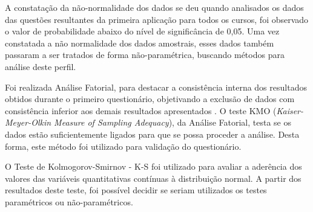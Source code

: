 A constatação da não-normalidade dos dados se deu quando
analisados os dados das questões resultantes da primeira aplicação para todos os cursos, foi observado o valor de probabilidade abaixo do nível de significância de 0,05. Uma vez constatada a não normalidade dos dados amostrais, esses dados também passaram a ser tratados de forma não-paramétrica, buscando métodos para análise deste perfil. 

Foi realizada Análise Fatorial, para destacar a consistência interna dos resultados obtidos durante o primeiro questionário, objetivando a exclusão de dados com consistência inferior aos demais resultados apresentados . O teste
KMO (\textit{Kaiser-Meyer-Olkin Measure of Sampling Adequacy}), da Análise Fatorial, testa se os dados estão suficientemente ligados para que se possa proceder a análise. Desta forma, este método foi utilizado para validação do questionário.

O Teste de Kolmogorov-Smirnov - K-S foi utilizado para avaliar a aderência dos valores das variáveis quantitativas contínuas à  distribuição  normal.  A  partir  dos  resultados  deste  teste,  foi  possível  decidir  se  seriam  utilizados  os  testes  paramétricos  ou  não-paramétricos.  








